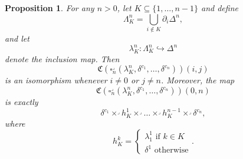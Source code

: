 \documentclass[leqno]{article}
\numberwithin{equation}{subsection}
\theoremstyle{plain}   %
\newtheorem{prop}[equation]{Proposition}
\theoremstyle{remark}
\theoremstyle{plain}
\begin{document}
\begin{prop}
	For any \(n>0\), let \(K\subseteq \{1,\dots,n-1\}\) and define
	\[\Lambda^n_K=\bigcup_{i\notin K} \partial_i \Delta^n,\]
	and let
	\[\lambda^n_K:\Lambda^n_K\hookrightarrow \Delta^n\]
	denote the inclusion map.  Then
	\[\mathfrak{C}(\square^\lrcorner_n(\lambda^n_K,\delta^{c_1},\dots,\delta^{c_n}))(i,j)\]
	is an isomorphism whenever \(i\neq 0\) or \(j\neq n\).  Moreover, the map
	\[\mathfrak{C}(\square^\lrcorner_n(\lambda^n_K,\delta^{c_1},\dots,\delta^{c_n}))(0,n)\]
	is exactly
	\[\delta^{c_1}\times^\lrcorner h^1_K \times^\lrcorner \dots \times^\lrcorner h^{n-1}_K \times^\lrcorner \delta^{c_n},\]
	where
	\[
		h^k_K =
		\begin{cases}
			\lambda^1_1 \text{ if } k\in K \\
			\delta^1 \text{ otherwise}
		\end{cases}.
	\]
\end{prop}
\end{document}
